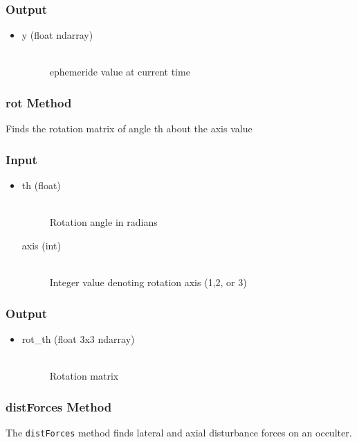 \documentclass[cleanfoot]{asme2ej}
\begin{document}
\subsubsection*{Output}
\begin{itemize}
\item
\begin{description}
    \item[y (float ndarray)] \hfill \\ ephemeride value at current time
\end{description}
\end{itemize}

\subsubsection{rot Method} 
Finds the rotation matrix of angle th about the axis value
\subsubsection*{Input}
\begin{itemize}
\item
\begin{description}
    \item[th (float)] \hfill \\ Rotation angle in radians
    \item[axis (int)] \hfill \\ Integer value denoting rotation axis (1,2, or 3)
\end{description}
\end{itemize}
\subsubsection*{Output}
\begin{itemize}
\item
\begin{description}
    \item[rot\_th (float 3x3 ndarray)] \hfill \\ Rotation matrix
\end{description}
\end{itemize}

\subsubsection{distForces Method} \label{sec:distforcestask} 
The \verb+distForces+ method finds lateral and axial disturbance forces on an occulter.
\end{document}
